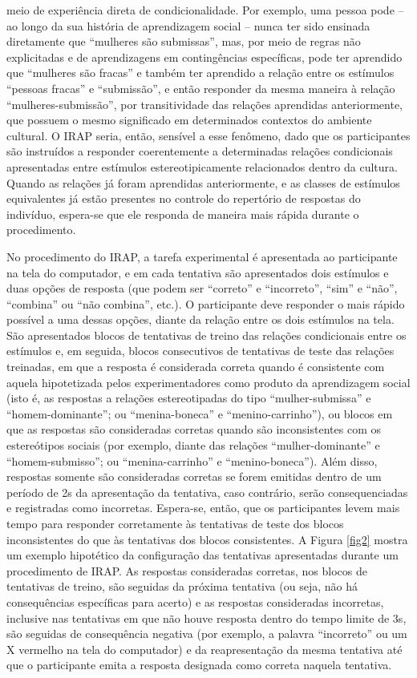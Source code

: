 meio de experiência direta de condicionalidade. Por exemplo, uma pessoa pode – ao longo da sua história de aprendizagem social – nunca ter sido ensinada diretamente que ``mulheres são submissas'', mas, por meio de regras não explicitadas e de aprendizagens em contingências específicas, pode ter aprendido que ``mulheres são fracas'' e também ter aprendido a relação entre os estímulos ``pessoas fracas'' e ``submissão'', e então responder da mesma maneira à relação ``mulheres-submissão'', por transitividade das relações aprendidas anteriormente, que possuem o mesmo significado em determinados contextos do ambiente cultural. O IRAP seria, então, sensível a esse fenômeno, dado que os participantes são instruídos a responder coerentemente a determinadas relações condicionais apresentadas entre estímulos estereotipicamente relacionados dentro da cultura. Quando as relações já foram aprendidas anteriormente, e as classes de estímulos equivalentes já estão presentes no controle do repertório de respostas do indivíduo, espera-se que ele responda de maneira mais rápida durante o procedimento.

No procedimento do IRAP, a tarefa experimental é apresentada ao participante na tela do computador, e em cada tentativa são apresentados dois estímulos e duas opções de resposta (que podem ser ``correto'' e ``incorreto'', ``sim'' e ``não'', ``combina'' ou ``não combina'', etc.). O participante deve responder o mais rápido possível a uma dessas opções, diante da relação entre os dois estímulos na tela. São apresentados blocos de tentativas de treino das relações condicionais entre os estímulos e, em seguida, blocos consecutivos de tentativas de teste das relações treinadas, em que a resposta é considerada correta quando é consistente com aquela hipotetizada pelos experimentadores como produto da aprendizagem social (isto é, as respostas a relações estereotipadas do tipo ``mulher-submissa'' e ``homem-dominante''; ou ``menina-boneca'' e ``menino-carrinho''), ou blocos em que as respostas são consideradas corretas quando são inconsistentes com os estereótipos sociais (por exemplo, diante das relações ``mulher-dominante'' e ``homem-submisso''; ou ``menina-carrinho'' e ``menino-boneca''). Além disso, respostas somente são consideradas corretas se forem emitidas dentro de um período de 2s da apresentação da tentativa, caso contrário, serão consequenciadas e registradas como incorretas. Espera-se, então, que os participantes levem mais tempo para responder corretamente às tentativas de teste dos blocos inconsistentes do que às tentativas dos blocos consistentes. A Figura \ref{fig2} mostra um exemplo hipotético da configuração das tentativas apresentadas durante um procedimento de IRAP. As respostas consideradas corretas, nos blocos de tentativas de treino, são seguidas da próxima tentativa (ou seja, não há consequências específicas para acerto) e as respostas consideradas incorretas, inclusive nas tentativas em que não houve resposta dentro do tempo limite de 3s, são seguidas de consequência negativa (por exemplo, a palavra ``incorreto'' ou um X vermelho na tela do computador) e da reapresentação da mesma tentativa até que o participante emita a resposta designada como correta naquela tentativa. 

